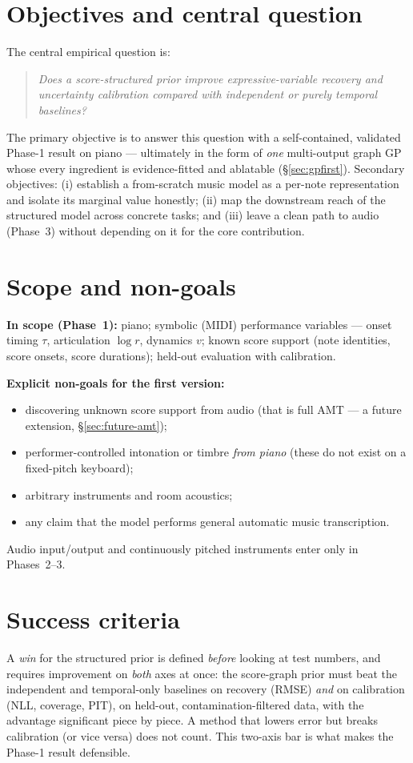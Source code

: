 \documentclass[11pt,a4paper]{report}
\begin{document}
\section{Objectives and central question}
The central empirical question is:
\begin{quote}
\itshape Does a score-structured prior improve expressive-variable recovery
\emph{and} uncertainty calibration compared with independent or purely temporal
baselines?
\end{quote}
The primary objective is to answer this question with a self-contained, validated
Phase-1 result on piano --- ultimately in the form of \emph{one} multi-output graph
GP whose every ingredient is evidence-fitted and ablatable
(\S\ref{sec:gpfirst}). Secondary objectives: (i) establish a from-scratch music
model as a per-note representation and isolate its marginal value honestly;
(ii) map the downstream reach of the structured model across concrete tasks; and
(iii) leave a clean path to audio (Phase~3) without depending on it for the core
contribution.

\section{Scope and non-goals}\label{sec:scope}
\textbf{In scope (Phase~1):} piano; symbolic (MIDI) performance variables ---
onset timing $\tau$, articulation $\log r$, dynamics $v$; known score support
(note identities, score onsets, score durations); held-out evaluation with
calibration.

\noindent\textbf{Explicit non-goals for the first version:}
\begin{itemize}[leftmargin=*,noitemsep]
  \item discovering unknown score support from audio (that is full AMT --- a future
        extension, \S\ref{sec:future-amt});
  \item performer-controlled intonation or timbre \emph{from piano} (these do not
        exist on a fixed-pitch keyboard);
  \item arbitrary instruments and room acoustics;
  \item any claim that the model performs general automatic music transcription.
\end{itemize}
Audio input/output and continuously pitched instruments enter only in Phases~2--3.

\section{Success criteria}
A \emph{win} for the structured prior is defined \emph{before} looking at test
numbers, and requires improvement on \emph{both} axes at once: the score-graph
prior must beat the independent and temporal-only baselines on recovery (RMSE)
\emph{and} on calibration (NLL, coverage, PIT), on held-out, contamination-filtered
data, with the advantage significant piece by piece. A method that lowers error but
breaks calibration (or vice versa) does not count. This two-axis bar is what makes
the Phase-1 result defensible.
\end{document}
